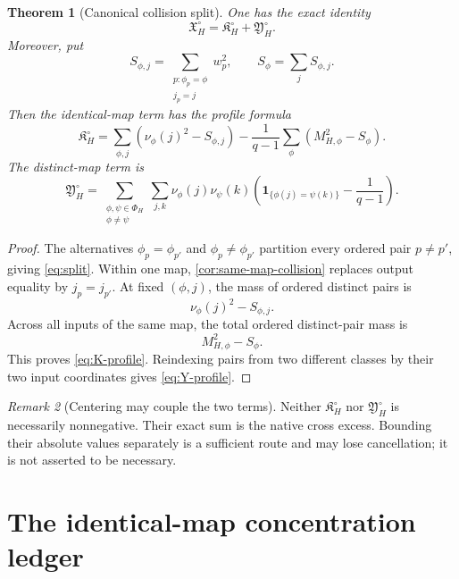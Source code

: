 \documentclass[11pt]{article}
\newtheorem{theorem}{Theorem}[section]
\theoremstyle{definition}
\theoremstyle{remark}
\newtheorem{remark}[theorem]{Remark}
\newcommand{\one}{\mathbf 1}
\begin{document}
\begin{theorem}[Canonical collision split]
\label{thm:split}
One has the exact identity
\begin{equation}
 \boxed{
 \mathfrak X_H^\circ
 =
 \mathfrak K_H^\circ+\mathfrak Y_H^\circ.}
\label{eq:split}
\end{equation}
Moreover, put
\[
 S_{\phi,j}
 =
 \sum_{\substack{p:\phi_p=\phi\\j_p=j}}w_p^2,
\qquad
 S_\phi=\sum_jS_{\phi,j}.
\]
Then the identical-map term has the profile formula
\begin{equation}
 \boxed{
 \mathfrak K_H^\circ
 =
 \sum_{\phi,j}
 \left(\nu_\phi(j)^2-S_{\phi,j}\right)
 -
 \frac1{q-1}
 \sum_\phi
 \left(M_{H,\phi}^2-S_\phi\right).}
\label{eq:K-profile}
\end{equation}
The distinct-map term is
\begin{equation}
 \boxed{
 \mathfrak Y_H^\circ
 =
 \sum_{\substack{\phi,\psi\in\Phi_H\\\phi\ne\psi}}
 \sum_{j,k}
 \nu_\phi(j)\nu_\psi(k)
 \left(
 \one_{\{\phi(j)=\psi(k)\}}-\frac1{q-1}
 \right).}
\label{eq:Y-profile}
\end{equation}
\end{theorem}

\begin{proof}
The alternatives \(\phi_p=\phi_{p'}\) and
\(\phi_p\ne\phi_{p'}\) partition every ordered pair \(p\ne p'\),
giving \eqref{eq:split}.  Within one map,
\cref{cor:same-map-collision} replaces output equality by
\(j_p=j_{p'}\).  At fixed \((\phi,j)\), the mass of ordered distinct
pairs is
\[
 \nu_\phi(j)^2-S_{\phi,j}.
\]
Across all inputs of the same map, the total ordered distinct-pair
mass is
\[
 M_{H,\phi}^2-S_\phi.
\]
This proves \eqref{eq:K-profile}.  Reindexing pairs from two
different classes by their two input coordinates gives
\eqref{eq:Y-profile}.
\end{proof}

\begin{remark}[Centering may couple the two terms]
Neither \(\mathfrak K_H^\circ\) nor
\(\mathfrak Y_H^\circ\) is necessarily nonnegative.  Their exact
sum is the native cross excess.  Bounding their absolute values
separately is a sufficient route and may lose cancellation; it is
not asserted to be necessary.
\end{remark}

\section{The identical-map concentration ledger}
\label{sec:concentration}
\end{document}
